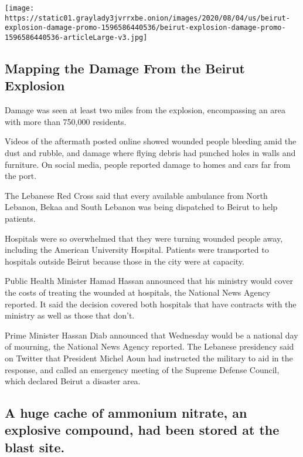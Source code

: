 \href{https://www.nytimes3xbfgragh.onion/interactive/2020/08/04/world/middleeast/beirut-explosion-damage.html}{}

\texttt{[image: https://static01.graylady3jvrrxbe.onion/images/2020/08/04/us/beirut-explosion-damage-promo-1596586440536/beirut-explosion-damage-promo-1596586440536-articleLarge-v3.jpg]}

\hypertarget{mapping-the-damage-from-the-beirut-explosion}{%
\subsection{Mapping the Damage From the Beirut
Explosion}\label{mapping-the-damage-from-the-beirut-explosion}}

Damage was seen at least two miles from the explosion, encompassing an
area with more than 750,000 residents.

Videos of the aftermath posted online showed wounded people bleeding
amid the dust and rubble, and damage where flying debris had punched
holes in walls and furniture. On social media, people reported damage to
homes and cars far from the port.

The Lebanese Red Cross said that every available ambulance from North
Lebanon, Bekaa and South Lebanon was being dispatched to Beirut to help
patients.

Hospitals were so overwhelmed that they were turning wounded people
away, including the American University Hospital. Patients were
transported to hospitals outside Beirut because those in the city were
at capacity.

Public Health Minister Hamad Hassan announced that his ministry would
cover the costs of treating the wounded at hospitals, the National News
Agency reported. It said the decision covered both hospitals that have
contracts with the ministry as well as those that don't.

Prime Minister Hassan Diab announced that Wednesday would be a national
day of mourning, the National News Agency reported. The Lebanese
presidency said on Twitter that President Michel Aoun had instructed the
military to aid in the response, and called an emergency meeting of the
Supreme Defense Council, which declared Beirut a disaster area.

\hypertarget{a-huge-cache-of-ammonium-nitrate-an-explosive-compound-had-been-stored-at-the-blast-site}{%
\subsection{A huge cache of ammonium nitrate, an explosive compound, had
been stored at the blast
site.}\label{a-huge-cache-of-ammonium-nitrate-an-explosive-compound-had-been-stored-at-the-blast-site}}

